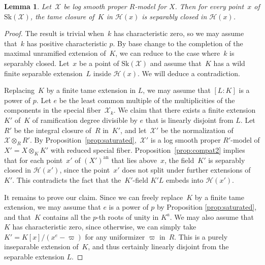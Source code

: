 \documentclass[11pt]{article}
\newtheorem{lemma}[equation]{Lemma}
\theoremstyle{definition}
\numberwithin{equation}{subsection}
\newcommand{\cX}{\ensuremath{\mathscr{X}}}
\newcommand{\an}{\mathrm{an}}
\newcommand{\Sk}{\mathrm{Sk}}
\let\unif\varpi
\begin{document}
\begin{lemma}\label{lemma:tame}
Let~$\cX$ be log smooth proper $R$\nobreakdash-model for $X$. Then for every point~$x$ of $\Sk(\cX)$, the tame closure of~$K$ in $\mathscr{H}(x)$ is separably closed in $\mathscr{H}(x)$.
\end{lemma}
\begin{proof}
The result is trivial when~$k$ has characteristic zero, so we may assume that~$k$ has positive characteristic $p$. By base change to the completion of the maximal unramified extension of~$K$, we can reduce to the case where~$k$ is separably closed.
Let~$x$ be a point of $\Sk(\cX)$ and assume that~$K$ has a wild finite separable extension~$L$ inside $\mathscr{H}(x)$. We will deduce a contradiction.

Replacing~$K$ by a finite tame extension in $L$, we may assume that $[L\colon K]$ is a power of $p$. Let $e$ be the least common multiple of the multiplicities of the components in the special fiber~$\cX_k$. We claim that there exists a finite extension~$K'$ of~$K$ of ramification degree divisible by $e$ that is linearly disjoint from $L$.
Let $R'$ be the integral closure of~$R$ in~$K'$, and let~$\cX'$ be the normalization of $\cX\otimes_R R'$. By Proposition~\ref{prop:saturated},~$\cX'$ is a log smooth proper $R'$-model of $X'=X\otimes_K K'$ with reduced special fiber.
Proposition~\ref{prop:compat2} implies that for each point~$x'$ of $(X')^{\an}$ that lies above~$x$, the field~$K'$ is separably closed in $\mathscr{H}(x')$, since the point~$x'$ does not split under further extensions of~$K'$. This contradicts the fact that the~$K'$-field $K'L$ embeds into $\mathscr{H}(x')$.

It remains to prove our claim. Since we can freely replace~$K$ by a finite tame extension, we may assume that $e$ is a power of $p$ by Proposition \ref{prop:saturated}, and that~$K$ contains all the $p$-th roots of unity in $K^a$. We may also assume that~$K$ has characteristic zero, since otherwise, we can simply take $K'=K[x]/(x^e-\unif)$ for any uniformizer $\unif$ in~$R$. This is a purely inseparable extension of~$K$, and thus certainly linearly disjoint from
the separable extension $L$.


\end{proof}
\end{document}
